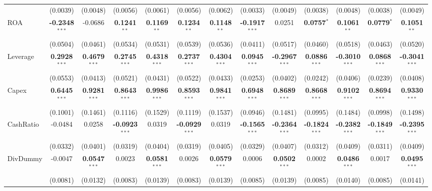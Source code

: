 \begin{landscape}
\begin{table}[H]
\begin{tabular}{lcccccccccccc}
 & (0.0039) & (0.0048) & (0.0056) & (0.0061) & (0.0056) & (0.0062) & (0.0033) & (0.0049) & (0.0038) & (0.0048) & (0.0038) & (0.0049) \\
ROA & \textbf{-0.2348}$^{***}$ & -0.0686 & \textbf{0.1241}$^{**}$ & \textbf{0.1169}$^{**}$ & \textbf{0.1234}$^{**}$ & \textbf{0.1148}$^{**}$ & \textbf{-0.1917}$^{***}$ & 0.0251 & \textbf{0.0757}$^{*}$ & \textbf{0.1061}$^{**}$ & \textbf{0.0779}$^{*}$ & \textbf{0.1051}$^{**}$ \\
 & (0.0504) & (0.0461) & (0.0534) & (0.0531) & (0.0539) & (0.0536) & (0.0411) & (0.0517) & (0.0460) & (0.0518) & (0.0463) & (0.0520) \\
Leverage & \textbf{0.2928}$^{***}$ & \textbf{0.4679}$^{***}$ & \textbf{0.2745}$^{***}$ & \textbf{0.4318}$^{***}$ & \textbf{0.2737}$^{***}$ & \textbf{0.4304}$^{***}$ & \textbf{0.0945}$^{***}$ & \textbf{-0.2967}$^{***}$ & \textbf{0.0886}$^{***}$ & \textbf{-0.3010}$^{***}$ & \textbf{0.0868}$^{***}$ & \textbf{-0.3041}$^{***}$ \\
 & (0.0553) & (0.0413) & (0.0521) & (0.0431) & (0.0522) & (0.0433) & (0.0253) & (0.0402) & (0.0242) & (0.0406) & (0.0239) & (0.0408) \\
Capex & \textbf{0.6445}$^{***}$ & \textbf{0.9281}$^{***}$ & \textbf{0.8643}$^{***}$ & \textbf{0.9986}$^{***}$ & \textbf{0.8593}$^{***}$ & \textbf{0.9841}$^{***}$ & \textbf{0.6948}$^{***}$ & \textbf{0.8689}$^{***}$ & \textbf{0.8668}$^{***}$ & \textbf{0.9102}$^{***}$ & \textbf{0.8694}$^{***}$ & \textbf{0.9330}$^{***}$ \\
 & (0.1001) & (0.1461) & (0.1116) & (0.1529) & (0.1119) & (0.1537) & (0.0946) & (0.1481) & (0.0995) & (0.1484) & (0.0998) & (0.1498) \\
CashRatio & -0.0484 & 0.0258 & \textbf{-0.0923}$^{***}$ & 0.0319 & \textbf{-0.0929}$^{***}$ & 0.0319 & \textbf{-0.1565}$^{***}$ & \textbf{-0.2364}$^{***}$ & \textbf{-0.1824}$^{***}$ & \textbf{-0.2382}$^{***}$ & \textbf{-0.1849}$^{***}$ & \textbf{-0.2395}$^{***}$ \\
 & (0.0332) & (0.0401) & (0.0319) & (0.0404) & (0.0319) & (0.0405) & (0.0329) & (0.0407) & (0.0312) & (0.0409) & (0.0311) & (0.0409) \\
DivDummy & -0.0047 & \textbf{0.0547}$^{***}$ & 0.0023 & \textbf{0.0581}$^{***}$ & 0.0026 & \textbf{0.0579}$^{***}$ & 0.0006 & \textbf{0.0502}$^{***}$ & 0.0002 & \textbf{0.0486}$^{***}$ & 0.0017 & \textbf{0.0495}$^{***}$ \\
 & (0.0081) & (0.0132) & (0.0083) & (0.0139) & (0.0083) & (0.0139) & (0.0085) & (0.0139) & (0.0085) & (0.0140) & (0.0085) & (0.0141) \\

\end{tabular}
\end{table}
\end{landscape}
